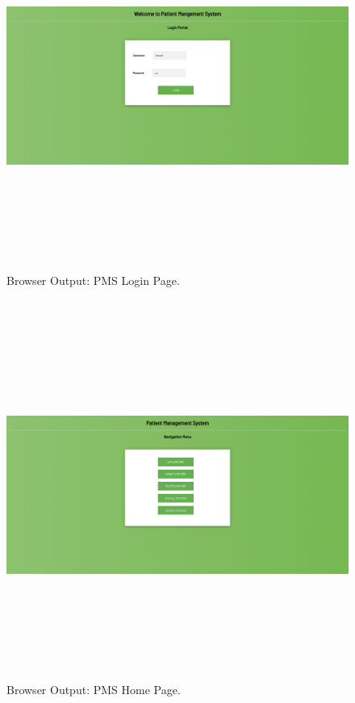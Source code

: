 \documentclass[12pt, a4]{article}
\begin{document}
\newpage
\subsection*{}
\begin{figure}[h]
\centering
\caption{Browser Output: PMS Login Page.}
\includegraphics[height=12cm, width=16cm]{Output/PMSLogin.png}
\end{figure}

\newpage
\subsection*{}
\begin{figure}[h]
\centering
\caption{Browser Output: PMS Home Page.}
\includegraphics[height=12cm, width=16cm]{Output/PMSMenu.png}
\end{figure}
\end{document}
